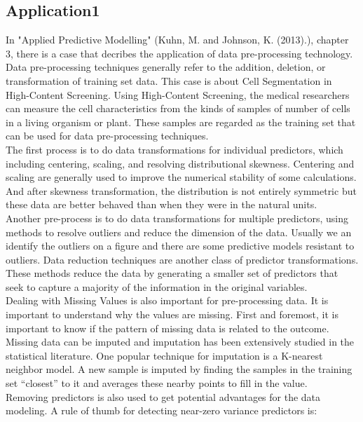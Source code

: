 \documentclass{article}%
\begin{document}
\subsection{Application1}
In "Applied Predictive Modelling" (Kuhn, M. and Johnson, K. (2013).), chapter 3, there is a case that decribes the application of data pre-processing technology. \\
\indent Data pre-processing techniques generally refer to the addition, deletion, or transformation of training set data. This case is about Cell Segmentation in High-Content Screening. Using High-Content Screening, the medical researchers can measure the cell characteristics from the kinds of samples of number of cells in a living organism or plant. These samples are regarded as the training set that can be used for data pre-processing techniques.\\
\indent The first process is to do data transformations for individual predictors, which including centering, scaling, and resolving distributional skewness. Centering and scaling are generally used to improve the numerical stability of some calculations. And after skewness transformation, the distribution is not entirely symmetric but these data are better behaved than when they were in the natural units.\\
\indent Another pre-process is to do data transformations for multiple predictors, using methods to resolve outliers and reduce the dimension of the data. Usually we an identify the outliers on a figure and there are some predictive models resistant to outliers. Data reduction techniques are another class of predictor transformations. These methods reduce the data by generating a smaller set of predictors that seek to capture a majority of the information in the original variables.\\
\indent Dealing with Missing Values is also important for pre-processing data. It is important to understand why the values are missing. First and foremost,
it is important to know if the pattern of missing data is related to the outcome. Missing data can be imputed and imputation has been extensively studied in the statistical literature. One popular technique for imputation is a K-nearest neighbor model. A new sample is imputed by finding the samples in the training set “closest” to it and averages these nearby points to fill in the value.\\
\indent Removing predictors is also used to get potential advantages for the data modeling. A rule of thumb for detecting near-zero variance predictors is:\\
\end{document}
